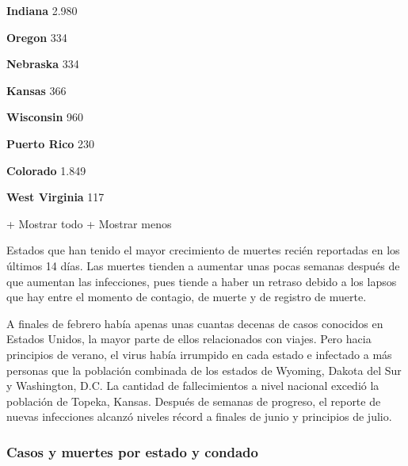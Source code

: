 \textbf{Indiana} 2.980

\href{https://www.nytimes.com/interactive/2020/us/oregon-coronavirus-cases.html}{}

\textbf{Oregon} 334

\href{https://www.nytimes.com/interactive/2020/us/nebraska-coronavirus-cases.html}{}

\textbf{Nebraska} 334

\href{https://www.nytimes.com/interactive/2020/us/kansas-coronavirus-cases.html}{}

\textbf{Kansas} 366

\href{https://www.nytimes.com/interactive/2020/us/wisconsin-coronavirus-cases.html}{}

\textbf{Wisconsin} 960

\href{https://www.nytimes.com/interactive/2020/us/puerto-rico-coronavirus-cases.html}{}

\textbf{Puerto Rico} 230

\href{https://www.nytimes.com/interactive/2020/us/colorado-coronavirus-cases.html}{}

\textbf{Colorado} 1.849

\href{https://www.nytimes.com/interactive/2020/us/west-virginia-coronavirus-cases.html}{}

\textbf{West Virginia} 117

+ Mostrar todo + Mostrar menos

Estados que han tenido el mayor crecimiento de muertes recién reportadas
en los últimos 14 días. Las muertes tienden a aumentar unas pocas
semanas después de que aumentan las infecciones, pues tiende a haber un
retraso debido a los lapsos que hay entre el momento de contagio, de
muerte y de registro de muerte.

A finales de febrero había apenas unas cuantas decenas de casos
conocidos en Estados Unidos, la mayor parte de ellos relacionados con
viajes. Pero hacia principios de verano, el virus había irrumpido en
cada estado e infectado a más personas que la población combinada de los
estados de Wyoming, Dakota del Sur y Washington, D.C. La cantidad de
fallecimientos a nivel nacional excedió la población de Topeka, Kansas.
Después de semanas de progreso, el reporte de nuevas infecciones alcanzó
niveles récord a finales de junio y principios de julio.

\hypertarget{casos-y-muertes-por-estado-y-condado}{%
\subsubsection{Casos y muertes por estado y
condado}\label{casos-y-muertes-por-estado-y-condado}}

